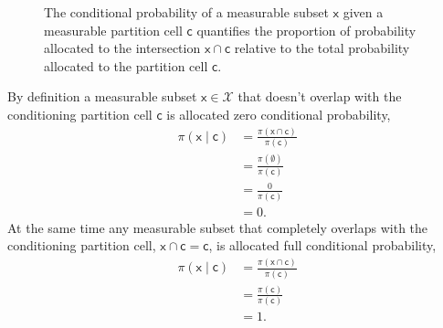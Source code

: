 \documentclass[
  letterpaper,
  DIV=11,
  numbers=noendperiod]{scrartcl}
\begin{document}
\begin{figure}


\caption{\label{fig-conditional-prob}The conditional probability of a
measurable subset \(\mathsf{x}\) given a measurable partition cell
\(\mathsf{c}\) quantifies the proportion of probability allocated to the
intersection \(\mathsf{x} \cap \mathsf{c}\) relative to the total
probability allocated to the partition cell \(\mathsf{c}\).}

\end{figure}%

By definition a measurable subset \(\mathsf{x} \in \mathcal{X}\) that
doesn't overlap with the conditioning partition cell \(\mathsf{c}\) is
allocated zero conditional probability, \begin{align*}
\pi( \mathsf{x} \mid \mathsf{c} )
&=
\frac{ \pi(\mathsf{x} \cap \mathsf{c}) }{ \pi (\mathsf{c}) }
\\
&=
\frac{ \pi(\emptyset) }{ \pi (\mathsf{c}) }
\\
&=
\frac{ 0 }{ \pi (\mathsf{c}) }
\\
&=
0.
\end{align*} At the same time any measurable subset that completely
overlaps with the conditioning partition cell,
\(\mathsf{x} \cap \mathsf{c} = \mathsf{c}\), is allocated full
conditional probability, \begin{align*}
\pi( \mathsf{x} \mid \mathsf{c} )
&=
\frac{ \pi(\mathsf{x} \cap \mathsf{c}) }{ \pi (\mathsf{c}) }
\\
&=
\frac{ \pi(\mathsf{c}) }{ \pi (\mathsf{c}) }
\\
&=
1.
\end{align*}
\end{document}

